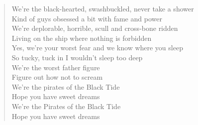 \documentclass[11pt]{article}
\begin{document}
\begin{verse}
\vspace*{1em}
We're the black-hearted, swashbuckled, never take a shower\\
Kind of guys obsessed a bit with fame and power\\
We're deplorable, horrible, scull and cross-bone ridden\\
Living on the ship where nothing is forbidden\\
\vspace*{1em}
Yes, we're your worst fear and we know where you sleep\\
So tucky, tuck in I wouldn't sleep too deep\\
We're the worst father figure\\
Figure out how not to scream\\
We're the pirates of the Black Tide\\
Hope you have sweet dreams\\
We're the Pirates of the Black Tide\\
Hope you have sweet dreams\\
\end{verse}
\clearpage
\end{document}

